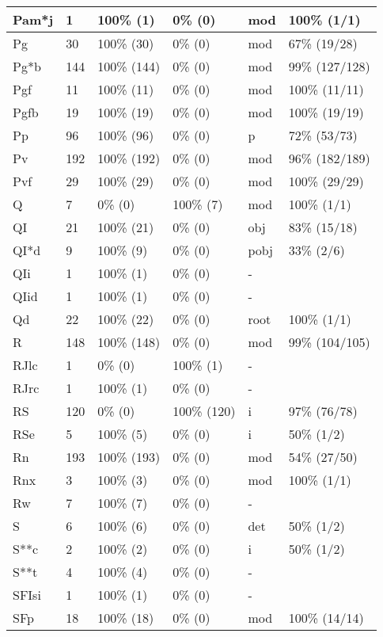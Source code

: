 \begin{figure*}
\begin{tabular}{|l|l|l|l||l|l|}
\hline
 Pam*j & 1 & 100\% (1) & 0\% (0) & mod & 100\% (1/1) \\ 
\hline
 Pg & 30 & 100\% (30) & 0\% (0) & mod & 67\% (19/28) \\ 
\hline
 Pg*b & 144 & 100\% (144) & 0\% (0) & mod & 99\% (127/128) \\ 
\hline
 Pgf & 11 & 100\% (11) & 0\% (0) & mod & 100\% (11/11) \\ 
\hline
 Pgfb & 19 & 100\% (19) & 0\% (0) & mod & 100\% (19/19) \\ 
\hline
 Pp & 96 & 100\% (96) & 0\% (0) & p & 72\% (53/73) \\ 
\hline
 Pv & 192 & 100\% (192) & 0\% (0) & mod & 96\% (182/189) \\ 
\hline
 Pvf & 29 & 100\% (29) & 0\% (0) & mod & 100\% (29/29) \\ 
\hline
 Q & 7 & 0\% (0) & 100\% (7) & mod & 100\% (1/1) \\ 
\hline
 QI & 21 & 100\% (21) & 0\% (0) & obj & 83\% (15/18) \\ 
\hline
 QI*d & 9 & 100\% (9) & 0\% (0) & pobj & 33\% (2/6) \\ 
\hline
 QIi & 1 & 100\% (1) & 0\% (0) & - &  \\ 
\hline
 QIid & 1 & 100\% (1) & 0\% (0) & - &  \\ 
\hline
 Qd & 22 & 100\% (22) & 0\% (0) & root & 100\% (1/1) \\ 
\hline
 R & 148 & 100\% (148) & 0\% (0) & mod & 99\% (104/105) \\ 
\hline
 RJlc & 1 & 0\% (0) & 100\% (1) & - &  \\ 
\hline
 RJrc & 1 & 100\% (1) & 0\% (0) & - &  \\ 
\hline
 RS & 120 & 0\% (0) & 100\% (120) & i & 97\% (76/78) \\ 
\hline
 RSe & 5 & 100\% (5) & 0\% (0) & i & 50\% (1/2) \\ 
\hline
 Rn & 193 & 100\% (193) & 0\% (0) & mod & 54\% (27/50) \\ 
\hline
 Rnx & 3 & 100\% (3) & 0\% (0) & mod & 100\% (1/1) \\ 
\hline
 Rw & 7 & 100\% (7) & 0\% (0) & - &  \\ 
\hline
 S & 6 & 100\% (6) & 0\% (0) & det & 50\% (1/2) \\ 
\hline
 S**c & 2 & 100\% (2) & 0\% (0) & i & 50\% (1/2) \\ 
\hline
 S**t & 4 & 100\% (4) & 0\% (0) & - &  \\ 
\hline
 SFIsi & 1 & 100\% (1) & 0\% (0) & - &  \\ 
\hline
 SFp & 18 & 100\% (18) & 0\% (0) & mod & 100\% (14/14) \\ 
\hline
\end{tabular}
\end{figure*}
